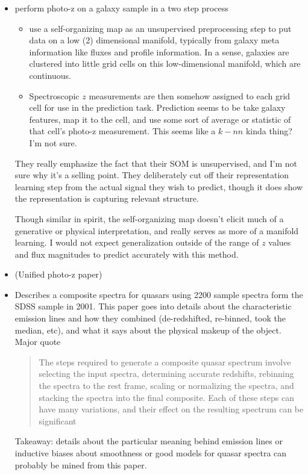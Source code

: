 \documentclass[11pt]{article}
\begin{document}
\begin{itemize}
\item \cite{kind2014somz} perform photo-z on a galaxy sample in a two step process\begin{itemize}
\item use a self-organizing map as an unsupervised preprocessing step to put data on a low (2) dimensional manifold, typically from galaxy meta information like fluxes and profile information.  In a sense, galaxies are clustered into little grid cells on this low-dimensional manifold, which are continuous.  
\item Spectroscopic $z$ measurements are then somehow assigned to each grid cell for use in the prediction task.  Prediction seems to be take galaxy features, map it to the cell, and use some sort of average or statistic of that cell's photo-z measurement.  This seems like a $k-nn$ kinda thing?  I'm not sure.  
\end{itemize}
They really emphasize the fact that their SOM is unsupervised, and I'm not sure why it's a selling point.  They deliberately cut off their representation learning step from the actual signal they wish to predict, though it does show the representation is capturing relevant structure.  

Though similar in spirit, the self-organizing map doesn't elicit much of a generative or physical interpretation, and really serves as more of a manifold learning.  I would not expect generalization outside of the range of $z$ values and flux magnitudes to predict accurately with this method.  

\item \cite{budavari2009unified} (Unified photo-z paper)

\item \cite{berk2001composite} Describes a composite spectra for quasars using 2200 sample spectra form the SDSS sample in 2001.  This paper goes into details about the characteristic emission lines and how they combined (de-redshifted, re-binned, took the median, etc), and what it says about the physical makeup of the object. Major quote
  \begin{quote}
  The steps required to generate a composite quasar spectrum involve selecting the input spectra, determining accurate redshifts, rebinning the spectra to the rest frame, scaling or normalizing the spectra, and stacking the spectra into the final composite. Each of these steps can have many variations, and their effect on the resulting spectrum can be significant
  \end{quote}
Takeaway: details about the particular meaning behind emission lines or inductive biases about smoothness or good models for quasar spectra can probably be mined from this paper.  


\end{itemize}
\end{document}
